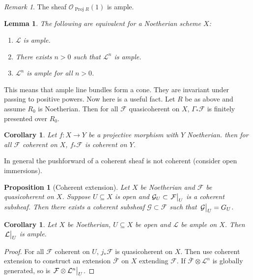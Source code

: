 \documentclass[leqno, openany]{memoir}
\newtheorem{cor}[thm]{Corollary}
\newtheorem{prop}[thm]{Proposition}
\newtheorem{lem}[thm]{Lemma}
\theoremstyle{definition}
\theoremstyle{remark}
\newtheorem{rmk}[thm]{Remark}
\theoremstyle{plain}
\theoremstyle{definition}
\theoremstyle{remark}
\newcommand{\mc}[1]{\mathcal{#1}}
\newcommand{\ol}[1]{\overline{#1}}
\DeclareMathOperator{\Proj}{Proj}
\begin{document}
\begin{rmk}
    The sheaf $\mc{O}_{\Proj R}(1)$ is ample.
\end{rmk}

\begin{lem}
    The following are equivalent for a Noetherian scheme $X$:
    \begin{enumerate}
        \item $\mc{L}$ is ample.
        \item There exists $n > 0$ such that $\mc{L}^n$ is ample.
        \item $\mc{L}^n$ is ample for all $n>0$.
    \end{enumerate}
\end{lem}

This means that ample line bundles form a cone. They are invariant under passing to positive powers. Now here is a useful fact. Let $R$ be as above and assume $R_0$ is Noetherian. Then for all $\mc{F}$ quasicoherent on $X$, $\Gamma_* \mc{F}$ is finitely presented over $R_0$.

\begin{cor}
    Let $f \colon X \to Y$ be a projective morphism with $Y$ Noetherian. then for all $\mc{F}$ coherent on $X$, $f_* \mc{F}$ is coherent on $Y$. 
\end{cor}

In general the pushforward of a coherent sheaf is not coherent (consider open immersions).

\begin{prop}[Coherent extension]
    Let $X$ be Noetherian and $\mc{F}$ be quasicoherent on $X$. Suppose $U \subseteq X$ is open and $\mc{G}_U \subset \eval{\mc{F}}_U$ is a coherent subsheaf. Then there exists a coherent subsheaf $\mc{G} \subset \mc{F}$ such that $\eval{\mc{G}}_U = G_U$.
\end{prop}

\begin{cor}
    Let $X$ be Noetherian, $U \subseteq X$ be open and $\mc{L}$ be ample on $X$. Then $\eval{\mc{L}}_U$ is ample.
\end{cor}

\begin{proof}
    For all $\mc{F}$ coherent on $U$, $j_* \mc{F}$ is quasicoherent on $X$. Then use coherent extension to construct an extension $\ol{\mc{F}}$ on $X$ extending $\mc{F}$. If $\ol{\mc{F}} \otimes \mc{L}^n$ is globally generated, so is $\eval{\mc{F} \otimes \mc{L}^n}_U$.
\end{proof}
\end{document}
